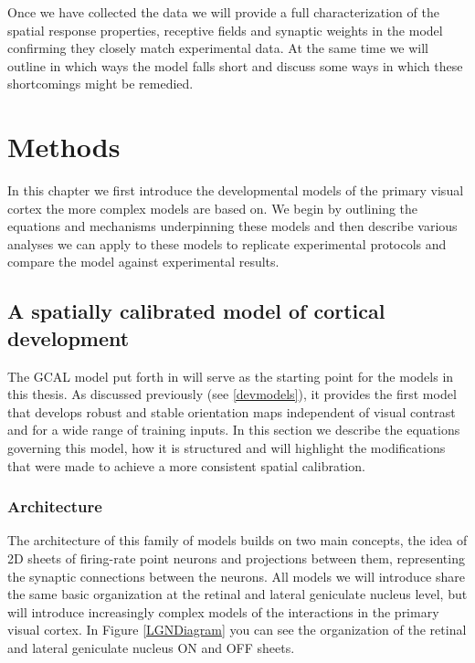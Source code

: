 Once we have collected the data we will provide a full
characterization of the spatial response properties, receptive fields
and synaptic weights in the model confirming they closely match
experimental data. At the same time we will outline in which ways the
model falls short and discuss some ways in which these shortcomings
might be remedied.

\section{Methods}

In this chapter we first introduce the developmental models of the
primary visual cortex the more complex models are based on. We begin
by outlining the equations and mechanisms underpinning these models
and then describe various analyses we can apply to these models to
replicate experimental protocols and compare the model against
experimental results.

\subsection{A spatially calibrated model of cortical development} 

The GCAL model put forth in \cite{Stevens2013} will serve as the
starting point for the models in this thesis. As discussed previously
(see \ref{devmodels}), it provides the first model that develops
robust and stable orientation maps independent of visual contrast and
for a wide range of training inputs. In this section we describe the
equations governing this model, how it is structured and will
highlight the modifications that were made to achieve a more
consistent spatial calibration.

\subsubsection{Architecture}

The architecture of this family of models builds on two main concepts,
the idea of 2D sheets of firing-rate point neurons and projections
between them, representing the synaptic connections between the
neurons. All models we will introduce share the same basic
organization at the retinal and lateral geniculate nucleus level, but
will introduce increasingly complex models of the interactions in the
primary visual cortex. In Figure \ref{LGNDiagram} you can see the
organization of the retinal and lateral geniculate nucleus ON and OFF
sheets.


